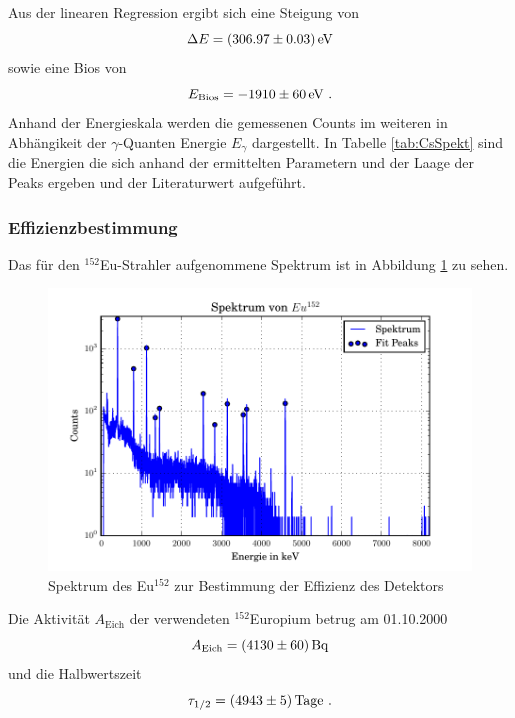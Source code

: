 Aus der linearen Regression ergibt sich eine Steigung von  
\begin{equation}
  \Delta E = (\num{306.97 +- 0.03}) \, \text{eV}
  \label{eqn:Reg}
\end{equation}
sowie eine Bios von 
\begin{equation}
  E_\text{Bios} = \num{-1910 +- 60} \, \text{eV} \ .
  \label{eqn:Bios}
\end{equation}
Anhand der Energieskala werden die gemessenen Counts im weiteren in Abhängikeit der $\gamma$-Quanten Energie $E_{\gamma}$ dargestellt. In Tabelle \ref{tab:CsSpekt} sind die Energien die sich anhand der ermittelten Parametern und der Laage der Peaks ergeben und der Literaturwert aufgeführt.


\subsubsection{Effizienzbestimmung}
\label{sec:Q}
Das für den $^{152}$Eu-Strahler aufgenommene Spektrum ist in Abbildung \ref{fig:SpekCs} zu sehen.
\begin{figure}[h]
  \centering
  \includegraphics[width=\textwidth]{./build/SpektEu.pdf}
   \caption{Spektrum des Eu$^{152}$ zur Bestimmung der Effizienz des Detektors}
  \label{fig:SpekCs}
\end{figure}
Die Aktivität $A_\text{Eich}$ der verwendeten $^{152}$Europium betrug am 01.10.2000
\begin{equation}
  A_\text{Eich} = (\num{4130 +- 60}) \, \text{Bq}
  \label{eqn:AktEu}
\end{equation}
und die Halbwertszeit
\begin{equation}
  \tau_{1/2} = (\num{4943 +- 5}) \, \text{Tage} \ .
  \label{eqn:halb}
\end{equation}
